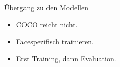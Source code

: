 \begin{frame}{Übergang zu den Modellen}
\begin{itemize}
    \item COCO reicht nicht.
    \item Facespezifisch trainieren.
    \item Erst Training, dann Evaluation.
\end{itemize}
\end{frame}
